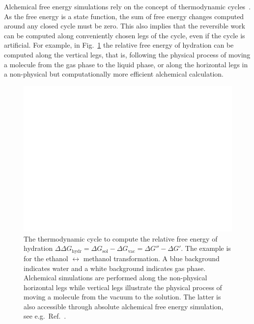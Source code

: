 \documentclass[journal=jctcce,manuscript=article]{achemso}
\begin{document}
Alchemical free energy simulations rely on the concept of thermodynamic
cycles~\cite{Tembe1984281}.
As the free energy is a state function, the sum of free energy changes
computed around any closed cycle must be zero.  This also implies
that the reversible work can be computed along
conveniently chosen legs of the cycle, even if the cycle is artificial.  For example, in
Fig.~\ref{fig:thermocycle} the relative free energy of hydration can
be computed along the vertical legs, that is, following the physical
process of moving a molecule from the gas phase to the liquid phase,
or along the horizontal legs in a non-physical but computationally more
efficient alchemical calculation.

\begin{figure}[ht]
  \includegraphics[scale=1.0]{figures/thermocycle.pdf}
  \caption{The thermodynamic cycle to compute the relative free energy
    of hydration
    $\Delta\Delta G_{\mathrm{hydr}}=\Delta G_{\mathrm{sol}}-\Delta
    G_{\mathrm{vac}}=\Delta G'' - \Delta G'$.  The example is for the
    ethanol $\leftrightarrow$ methanol transformation.  A blue background indicates water and a white background indicates gas phase. Alchemical
    simulations are performed along the non-physical horizontal
    legs while vertical legs illustrate the physical process of moving a
    molecule from the vacuum to the solution.  The latter is also accessible
    through absolute alchemical free energy simulation, see e.g.\
    Ref.~.}
  \label{fig:thermocycle}
\end{figure}
\end{document}

